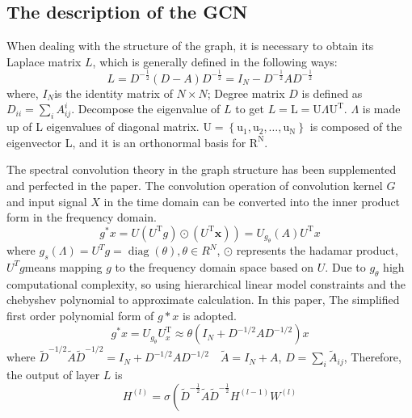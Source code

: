 \documentclass[journal,article,submit,moreauthors,pdftex]{Definitions/mdpi}
\begin{document}
\subsection{The description of the GCN} 
When dealing with the structure of the graph, it is necessary to obtain its Laplace matrix $L$, which is generally defined in the following ways:
\begin{equation}
    L=D^{-\frac{1}{2}}(D-A) D^{-\frac{1}{2}}=I_{N}-D^{-\frac{1}{2}} A D^{-\frac{1}{2}}
\end{equation}
where, $I_{N}$is the identity matrix of $N×N$; Degree matrix $D$ is defined as $D_{i i}=\sum_{i} A_{i j}^{i}$. Decompose the eigenvalue of $L$ to get $L = \mathrm{L}=\mathrm{U} \Lambda \mathrm{U}^{\mathrm{T}}$. $\Lambda$ is made up of L eigenvalues of diagonal matrix. $\mathrm{U}=\left\{\mathrm{u}_{1}, \mathrm{u}_{2}, \ldots, \mathrm{u}_{\mathrm{N}}\right\}$ is composed of the eigenvector L, and it is an orthonormal basis for $\mathrm{R}^{\mathrm{N}}$.
\par The spectral convolution theory in the graph structure has been supplemented and perfected in the paper. The convolution operation of convolution kernel $G$ and input signal $X$ in the time domain can be converted into the inner product form in the frequency domain.
\begin{equation}
    \left.g^{*} x=U\left(U^{\mathrm{T}} g\right) \odot\left(U^{\mathrm{T}} \boldsymbol{x}\right)\right)=U_{g_{\theta}}(A) U^{\mathrm{T}} x
\end{equation}
where $g_{s}(\Lambda)=U^{T} g=\operatorname{diag}(\theta), \theta \in R^{N}$, $\odot$ represents the hadamar product, $U^{T}g$means mapping $g$ to the frequency domain space based on $U$. Due to $g_{\theta}$ high computational complexity, so using hierarchical linear model constraints and the chebyshev polynomial to approximate calculation. In this paper, The simplified first order polynomial form of $g*x$ is adopted.
\begin{equation}
    g^{*} x=U_{g_{\theta}} U_{x}^{\mathrm{T}} \approx \theta\left(I_{N}+D^{-1 / 2} A D^{-1 / 2}\right) x
\end{equation}
where $\widetilde{D}^{-1 / 2} \widetilde{A} \widetilde{D}^{-1 / 2}=I_{N}+D^{-1 / 2} A D^{-1 / 2} \quad \tilde{A}=I_{N}+A $, ${D}=\sum_{i} \widetilde{A}_{i j}$, Therefore, the output of layer $L$ is
\begin{equation}
    H^{(l)}=\sigma\left(\widetilde{D}^{-\frac{1}{2}} \widetilde{A} \widetilde{D}^{-\frac{1}{2}} H^{(l-1)} W^{(l)}\right.
\end{equation}
\end{document}
